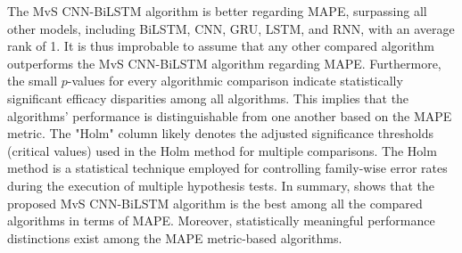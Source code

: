       The MvS CNN-BiLSTM algorithm is better regarding MAPE,  surpassing all other models,  including BiLSTM,  CNN,  GRU,  LSTM,  and RNN,  with an average rank of 1. It is thus improbable to assume that any other compared algorithm outperforms the MvS CNN-BiLSTM algorithm regarding MAPE. Furthermore,  the small $p$-values for every algorithmic comparison indicate statistically significant efficacy disparities among all algorithms. This implies that the algorithms' performance is distinguishable from one another based on the MAPE metric. The "Holm" column likely denotes the adjusted significance thresholds (critical values) used in the Holm method for multiple comparisons. The Holm method is a statistical technique employed for controlling family-wise error rates during the execution of multiple hypothesis tests. In summary,   shows that the proposed MvS CNN-BiLSTM algorithm is the best among all the compared algorithms in terms of MAPE. Moreover, statistically meaningful performance distinctions exist among the MAPE metric-based algorithms.
    



